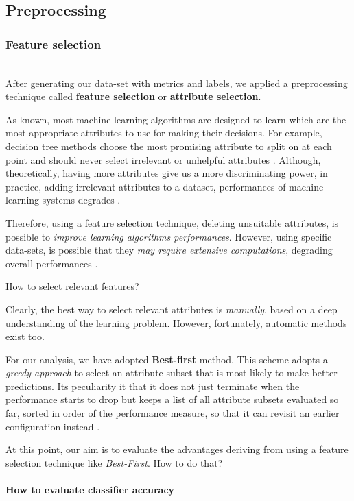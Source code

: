 \documentclass[sigconf]{acmart}
\begin{document}
\subsection{Preprocessing}

\subsubsection{Feature selection}
\hfill\\
After generating our data-set with metrics and labels, we applied a preprocessing technique called \textbf{feature selection} or \textbf{attribute selection}.

As known, most machine learning algorithms are designed to learn which are the most appropriate attributes to use for making their decisions. For example, decision tree methods choose the most promising attribute to split on at each point and should never select irrelevant or unhelpful attributes \cite{FalessiDataMining}. Although, theoretically, having more attributes give us a more discriminating power, in practice, adding irrelevant attributes to a dataset, performances of machine learning systems degrades \cite{FalessiDataMining}. 

Therefore, using a feature selection technique, deleting unsuitable attributes, is possible to \textit{improve learning algorithms performances}. However, using specific data-sets, is possible that they \textit{may require extensive computations}, degrading overall performances \cite{FalessiDataMining}.

How to select relevant features?

Clearly, the best way to select relevant attributes is \textit{manually}, based on a deep understanding of the learning problem. However, fortunately, automatic methods exist too. 

For our analysis, we have adopted \textbf{Best-first} method. This scheme adopts a \textit{greedy approach} to select an attribute subset that is most likely to make better predictions. Its peculiarity it that it does not just terminate when the performance starts to drop but keeps a list of all attribute subsets evaluated so far, sorted in order of the performance measure, so that it can revisit an earlier configuration instead \cite{FalessiDataMining}. 

At this point, our aim is to evaluate the advantages deriving from using a feature selection technique like \textit{Best-First}. How to do that?

\paragraph{How to evaluate classifier accuracy}
\hfill\\
\end{document}
